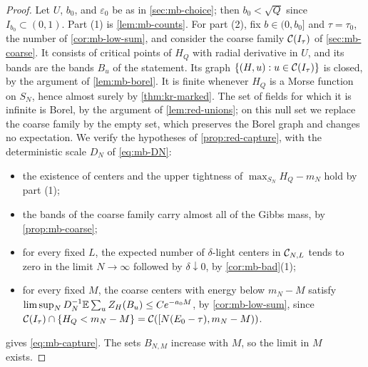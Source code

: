 \begin{proof}
Let $U$, $b_0$, and $\varepsilon_0$ be as in \cref{sec:mb-choice}; then $b_0<\sqrt Q$ since $I_{b_0}\subset(0,1)$. Part (1) is \cref{lem:mb-counts}. For part (2), fix $b\in(0,b_0]$ and $\tau=\tau_0$, the number of \cref{cor:mb-low-sum}, and consider the coarse family $\mathcal C(I_\tau)$ of \cref{sec:mb-coarse}. It consists of critical points of $H_Q$ with radial derivative in $U$, and its bands are the bands $B_u$ of the statement. Its graph $\{(H,u):u\in\mathcal C(I_\tau)\}$ is closed, by the argument of \cref{lem:mb-borel}. It is finite whenever $H_Q$ is a Morse function on $S_N$, hence almost surely by \cref{thm:kr-marked}. The set of fields for which it is infinite is Borel, by the argument of \cref{lem:red-unions}; on this null set we replace the coarse family by the empty set, which preserves the Borel graph and changes no expectation. We verify the hypotheses of \cref{prop:red-capture}, with the deterministic scale $D_N$ of \eqref{eq:mb-DN}:
\begin{itemize}
\item the existence of centers and the upper tightness of $\max_{S_N}H_Q-m_N$ hold by part (1);
\item the bands of the coarse family carry almost all of the Gibbs mass, by \cref{prop:mb-coarse};
\item for every fixed $L$, the expected number of $\delta$-light centers in $\mathcal C_{N,L}$ tends to zero in the limit $N\to\infty$ followed by $\delta\downarrow0$, by \cref{cor:mb-bad}(1);
\item for every fixed $M$, the coarse centers with energy below $m_N-M$ satisfy $\limsup_ND_N^{-1}\mathbb E\sum_uZ_H(B_u)\le Ce^{-a_0M}$, by \cref{cor:mb-low-sum}, since $\mathcal C(I_\tau)\cap\{H_Q<m_N-M\}=\mathcal C([N(E_0-\tau),m_N-M))$.
\end{itemize}
 gives \eqref{eq:mb-capture}. The sets $B_{N,M}$ increase with $M$, so the limit in $M$ exists.
\end{proof}

